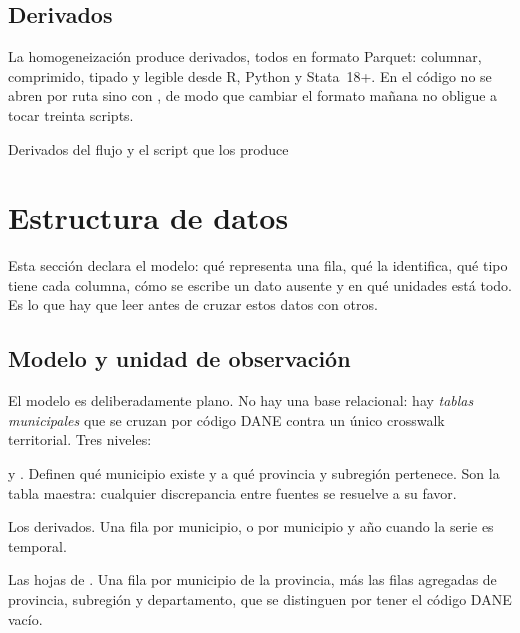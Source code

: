 \documentclass[11pt,a4paper]{article}
\begin{document}
\subsection{Derivados}

La homogeneización produce \cifraDerivados{} derivados, todos en formato
Parquet: columnar, comprimido, tipado y legible desde R, Python y Stata~18+.
En el código no se abren por ruta sino con , de modo
que cambiar el formato mañana no obligue a tocar treinta scripts.

\begin{table}[htbp]\centering
\caption{Derivados del flujo y el script que los produce}
\small

\end{table}

\section{Estructura de datos}
\label{sec:estructura}

Esta sección declara el modelo: qué representa una fila, qué la identifica, qué
tipo tiene cada columna, cómo se escribe un dato ausente y en qué unidades está
todo. Es lo que hay que leer antes de cruzar estos datos con otros.

\subsection{Modelo y unidad de observación}

El modelo es deliberadamente plano. No hay una base relacional: hay
\emph{tablas municipales} que se cruzan por código DANE contra un único
crosswalk territorial. Tres niveles:

\begin{description}[leftmargin=*, style=nextline, itemsep=3pt]
  \item[Nivel 0 — territorio]  y .
    Definen qué municipio existe y a qué provincia y subregión pertenece. Son la
    tabla maestra: cualquier discrepancia entre fuentes se resuelve a su favor.
  \item[Nivel 1 — indicadores municipales] Los \cifraDerivados{} derivados. Una
    fila por municipio, o por municipio y año cuando la serie es temporal.
  \item[Nivel 2 — salidas por provincia] Las hojas de
    . Una fila por municipio de la provincia, más las filas
    agregadas de provincia, subregión y departamento, que se distinguen por
    tener el código DANE vacío.
\end{description}
\end{document}
